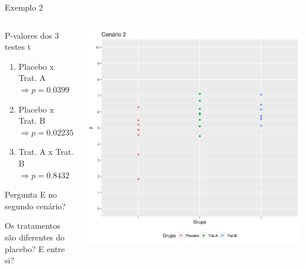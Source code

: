 \documentclass{beamer}
\begin{document}
\begin{frame}{Exemplo 2}
  \begin{columns}
    \begin{column}{5cm}
      \begin{exampleblock}{P-valores dos 3 testes t}
        \tiny
        \begin{enumerate}
        \item Placebo x Trat. A $\Rightarrow p=0.0399$
        \item Placebo x Trat. B $\Rightarrow p=0.02235$
        \item Trat. A x Trat. B $\Rightarrow p=0.8432$
        \end{enumerate}
      \end{exampleblock}
      \begin{exampleblock}{Pergunta}
        \small
        E no segundo cenário?

        Os tratamentos são diferentes do placebo?
        E entre si?
      \end{exampleblock}
    \end{column}
    \begin{column}{5cm}
      \includegraphics[width=\textwidth]{Cap13-30/cenario2}
    \end{column}
  \end{columns}
\end{frame}
\end{document}
